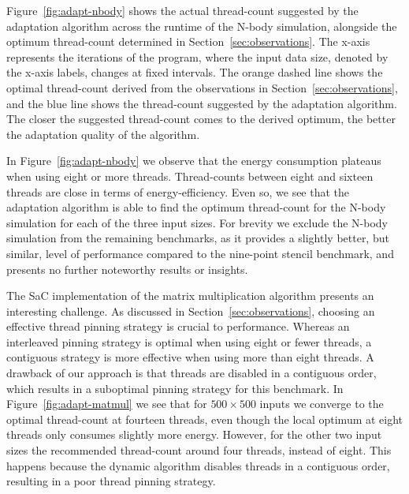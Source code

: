 \documentclass[runningheads]{llncs}
\begin{document}
Figure~\ref{fig:adapt-nbody} shows the actual thread-count suggested by the adaptation algorithm across the runtime of the N-body simulation, alongside the optimum thread-count determined in Section~\ref{sec:observations}.
The x-axis represents the iterations of the program, where the input data size, denoted by the x-axis labels, changes at fixed intervals.
The orange dashed line shows the optimal thread-count derived from the observations in Section~\ref{sec:observations}, and the blue line shows the thread-count suggested by the adaptation algorithm.
The closer the suggested thread-count comes to the derived optimum, the better the adaptation quality of the algorithm.

In Figure~\ref{fig:adapt-nbody} we observe that the energy consumption plateaus when using eight or more threads.
Thread-counts between eight and sixteen threads are close in terms of energy-efficiency.
Even so, we see that the adaptation algorithm is able to find the optimum thread-count for the N-body simulation for each of the three input sizes.
For brevity we exclude the N-body simulation from the remaining benchmarks, as it provides a slightly better, but similar, level of performance compared to the nine-point stencil benchmark, and presents no further noteworthy results or insights.

The SaC implementation of the matrix multiplication algorithm presents an interesting challenge.
As discussed in Section~\ref{sec:observations}, choosing an effective thread pinning strategy is crucial to performance.
Whereas an interleaved pinning strategy is optimal when using eight or fewer threads, a contiguous strategy is more effective when using more than eight threads.
A drawback of our approach is that threads are disabled in a contiguous order, which results in a suboptimal pinning strategy for this benchmark.
In Figure~\ref{fig:adapt-matmul} we see that for $500 \times 500$ inputs we converge to the optimal thread-count at fourteen threads, even though the local optimum at eight threads only consumes slightly more energy.
However, for the other two input sizes the recommended thread-count around four threads, instead of eight.
This happens because the dynamic algorithm disables threads in a contiguous order, resulting in a poor thread pinning strategy.
\end{document}
